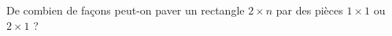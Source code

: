De combien de façons peut-on paver un rectangle $2 \times n$ par des pièces $1 \times 1$ ou $2 \times 1$ ?
